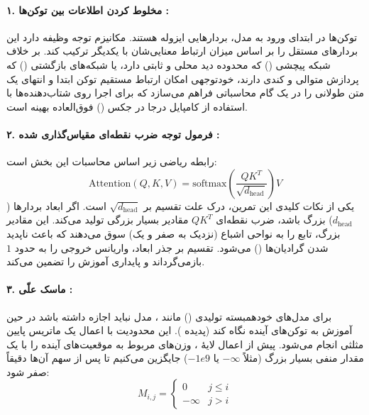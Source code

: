 \documentclass{article}
\begin{document}
\paragraph{۱. مخلوط کردن اطلاعات بین توکن‌ها :}
توکن‌ها در ابتدای ورود به مدل، بردارهایی ایزوله هستند. مکانیزم توجه وظیفه دارد این بردارهای مستقل را بر اساس میزان ارتباط معنایی‌شان با یکدیگر ترکیب کند. بر خلاف شبکه پیچشی () که محدوده دید محلی و ثابتی دارد، یا شبکه‌های بازگشتی () که پردازش متوالی و کندی دارند، خود‌توجهی امکان ارتباط مستقیم توکن ابتدا و انتهای یک متن طولانی را در یک گام محاسباتی فراهم می‌سازد که برای اجرا روی شتاب‌دهنده‌ها با استفاده از کامپایل درجا در جکس () فوق‌العاده بهینه است.

\paragraph{۲. فرمول توجه ضرب نقطه‌ای مقیاس‌گذاری شده :}
رابطه ریاضی زیر اساس محاسبات این بخش است:
\[
\text{Attention}(Q, K, V) = \text{softmax}\left(\frac{Q K^T}{\sqrt{d_{\text{head}}}}\right) V
\]
یکی از نکات کلیدی این تمرین، درک علت تقسیم بر $\sqrt{d_{\text{head}}}$ است. اگر ابعاد بردارها ($d_{\text{head}}$) بزرگ باشد، ضرب نقطه‌ای $Q K^T$ مقادیر بسیار بزرگی تولید می‌کند. این مقادیر بزرگ، تابع  را به نواحی اشباع (نزدیک به صفر و یک) سوق می‌دهند که باعث ناپدید شدن گرادیان‌ها () می‌شود. تقسیم بر جذر ابعاد، واریانس خروجی را به حدود $1$ بازمی‌گرداند و پایداری آموزش را تضمین می‌کند.

\paragraph{۳. ماسک علّی :}
برای مدل‌های خودهمبسته تولیدی () مانند ، مدل نباید اجازه داشته باشد در حین آموزش به توکن‌های آینده نگاه کند (پدیده ). این محدودیت با اعمال یک ماتریس پایین مثلثی انجام می‌شود. پیش از اعمال لایۀ ، وزن‌های مربوط به موقعیت‌های آینده را با یک مقدار منفی بسیار بزرگ (مثلاً $-\infty$ یا $-1e9$) جایگزین می‌کنیم تا پس از  سهم آن‌ها دقیقاً صفر شود:
\[
M_{i, j} = 
\begin{cases} 
	0 & j \le i \\ 
	-\infty & j > i 
\end{cases}
\]
\end{document}
